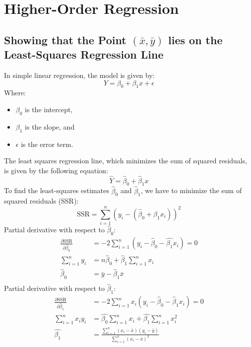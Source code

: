 \chapter{Higher-Order Regression}

\section{Showing that the Point \texorpdfstring{$(\bar{x}, \bar{y})$}{(x-bar, y
bar)} lies on the Least-Squares Regression Line}
In simple linear regression, the model is given by:
\begin{equation*}
    Y = \beta_0 + \beta_1 x + \epsilon
\end{equation*}
Where:
\begin{itemize}
    \setlength{\itemsep}{-2pt}
    \item $\beta_0$ is the intercept,
    \item $\beta_1$ is the slope, and
    \item $\epsilon$ is the error term.
\end{itemize}
The least squares regression line, which minimizes the sum of squared residuals,
is given by the following equation:
\begin{equation*}
    \hat{Y} = \hat{\beta}_0 + \hat{\beta}_1 x
\end{equation*}
To find the least-squares estimates $\hat{\beta}_0$ and $\hat{\beta}_1$, we have
to minimize the sum of squared residuals (SSR):
\begin{equation*}
\text{SSR} = \sum_{i=1}^{n} \left( y_i - (\hat{\beta}_0 + \hat{\beta}_1 x_i)
\right)^2
\end{equation*}
Partial derivative with respect to $\hat{\beta}_0$:
\begin{equation*}
    \begin{aligned}
        \frac{\partial \text{SSR}}{\partial \hat{\beta}_0} &= -2 \sum_{i=1}^{n}
        \left( y_i - \hat{\beta}_0 - \hat{\beta_1} x_i \right) = 0 \\
        \sum_{i=1}^{n} y_i &= n \hat{\beta}_0 + \hat{\beta}_1 \sum_{i=1}^{n} x_i
        \\
        \hat{\beta}_0 &= \bar{y} - \hat{\beta}_1 \bar{x} \\
    \end{aligned}
\end{equation*}
Partial derivative with respect to $\hat{\beta}_1$:
\begin{equation*}
    \begin{aligned}
        \frac{\partial \text{SSR}}{\partial \hat{\beta}_1} &= -2 \sum_{i=1}^{n}
        x_i \left( y_i - \hat{\beta}_0 - \hat{\beta}_1 x_i \right) = 0 \\
        \sum_{i=1}^{n} x_i y_i &= \hat{\beta_0} \sum_{i=1}^{n} x_i +
        \hat{\beta_1} \sum_{i=1}^{n} x_i^2 \\
        \hat{\beta_1} &= \frac{\sum_{i=1}^{n} (x_i - \bar{x})(y_i - \bar{y})}
        {\sum_{i=1}^{n} (x_i - \bar{x})^2} \\
    \end{aligned}
\end{equation*}
